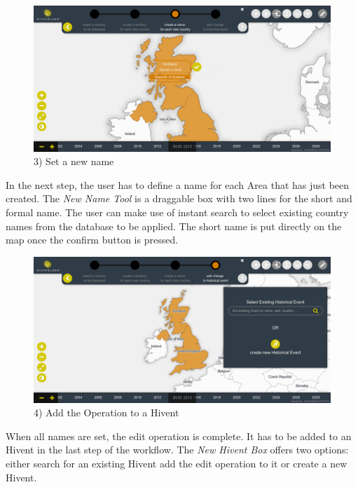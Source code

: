 \vspace{1em}
\begin{minipage}[t]{0.47\textwidth}

  \begin{figure}[H]
    \centering
    \includegraphics[width=1.0\textwidth]{graphics/development/user_interface_design_process/5_set_new_name.png}
    \caption{3) Set a new name}
    \label{fig:final_5_set_new_name}
  \end{figure}

  In the next step, the user has to define a name for each Area that has just been created. The \emph{New Name Tool} is a draggable box with two lines for the short and formal name. The user can make use of instant search to select existing country names from the database to be applied. The short name is put directly on the map once the confirm button is pressed.

\end{minipage}    %
\hspace{1.5em}    %
\begin{minipage}[t]{0.47\textwidth}

  \begin{figure}[H]
    \centering
    \includegraphics[width=1.0\textwidth]{graphics/development/user_interface_design_process/6_add_change_to_hivent_1.png}
    \caption{4) Add the Operation to a Hivent}
    \label{fig:final_6_add_change_to_hivent_1}
  \end{figure}

  When all names are set, the edit operation is complete. It has to be added to an Hivent in the last step of the workflow. The \emph{New Hivent Box} offers two options: either search for an existing Hivent add the edit operation to it or create a new Hivent.

\end{minipage}


